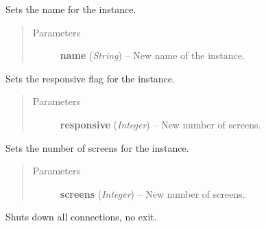 \documentclass[letterpaper,10pt,english]{sphinxmanual}
\begin{document}
\begin{fulllineitems}

\begin{fulllineitems}
\label{swnp:swnp.SWNP.set_name}
Sets the name for the instance.
\begin{quote}\begin{description}
\item[{Parameters}] \leavevmode
\textbf{name} (\emph{String}) -- New name of the instance.

\end{description}\end{quote}

\end{fulllineitems}


\begin{fulllineitems}
\label{swnp:swnp.SWNP.set_responsive}
Sets the responsive flag for the instance.
\begin{quote}\begin{description}
\item[{Parameters}] \leavevmode
\textbf{responsive} (\emph{Integer}) -- New number of screens.

\end{description}\end{quote}

\end{fulllineitems}


\begin{fulllineitems}
\label{swnp:swnp.SWNP.set_screens}
Sets the number of screens for the instance.
\begin{quote}\begin{description}
\item[{Parameters}] \leavevmode
\textbf{screens} (\emph{Integer}) -- New number of screens.

\end{description}\end{quote}

\end{fulllineitems}


\begin{fulllineitems}
\label{swnp:swnp.SWNP.shutdown}
Shuts down all connections, no exit.


\end{fulllineitems}
\end{fulllineitems}
\end{document}
